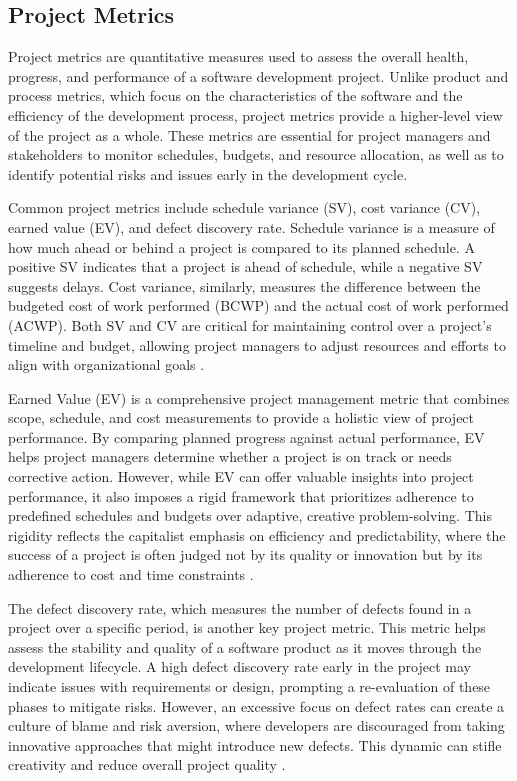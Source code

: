 \begin{refsection}
\subsection{Project Metrics}

Project metrics are quantitative measures used to assess the overall health, progress, and performance of a software development project. Unlike product and process metrics, which focus on the characteristics of the software and the efficiency of the development process, project metrics provide a higher-level view of the project as a whole. These metrics are essential for project managers and stakeholders to monitor schedules, budgets, and resource allocation, as well as to identify potential risks and issues early in the development cycle.

Common project metrics include schedule variance (SV), cost variance (CV), earned value (EV), and defect discovery rate. Schedule variance is a measure of how much ahead or behind a project is compared to its planned schedule. A positive SV indicates that a project is ahead of schedule, while a negative SV suggests delays. Cost variance, similarly, measures the difference between the budgeted cost of work performed (BCWP) and the actual cost of work performed (ACWP). Both SV and CV are critical for maintaining control over a project's timeline and budget, allowing project managers to adjust resources and efforts to align with organizational goals \cite[pp.~245-247]{Kerzner2017ProjectManagement}.

Earned Value (EV) is a comprehensive project management metric that combines scope, schedule, and cost measurements to provide a holistic view of project performance. By comparing planned progress against actual performance, EV helps project managers determine whether a project is on track or needs corrective action. However, while EV can offer valuable insights into project performance, it also imposes a rigid framework that prioritizes adherence to predefined schedules and budgets over adaptive, creative problem-solving. This rigidity reflects the capitalist emphasis on efficiency and predictability, where the success of a project is often judged not by its quality or innovation but by its adherence to cost and time constraints \cite[pp.~110-113]{Fleming2005EarnedValue}.

The defect discovery rate, which measures the number of defects found in a project over a specific period, is another key project metric. This metric helps assess the stability and quality of a software product as it moves through the development lifecycle. A high defect discovery rate early in the project may indicate issues with requirements or design, prompting a re-evaluation of these phases to mitigate risks. However, an excessive focus on defect rates can create a culture of blame and risk aversion, where developers are discouraged from taking innovative approaches that might introduce new defects. This dynamic can stifle creativity and reduce overall project quality \cite[pp.~299-302]{Humphrey2005ManagingSoftware}.


\end{refsection}

